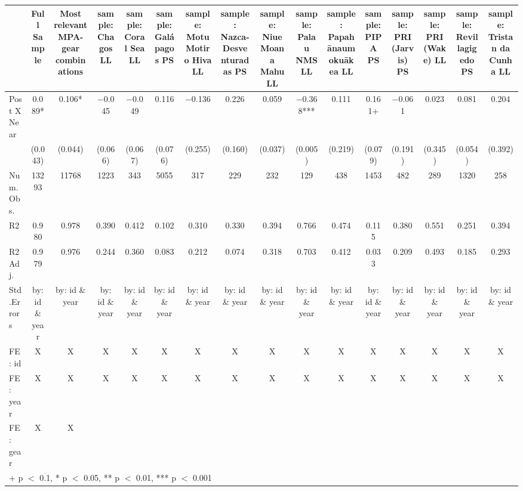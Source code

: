 \begin{table}
\centering
\begin{tabular}[t]{lccccccccccccccc}
\toprule
  & Full Sample & Most relevant MPA-gear combinations & sample: Chagos LL & sample: Coral Sea LL & sample: Galápagos PS & sample: Motu Motiro Hiva LL & sample: Nazca-Desventuradas PS & sample: Niue Moana Mahu LL & sample: Palau NMS LL & sample: Papahānaumokuākea LL & sample: PIPA PS & sample: PRI (Jarvis) PS & sample: PRI (Wake) LL & sample: Revillagigedo PS & sample: Tristan da Cunha LL\\
\midrule
Post X Near & \num{0.089}* & \num{0.106}* & \num{-0.045} & \num{-0.049} & \num{0.116} & \num{-0.136} & \num{0.226} & \num{0.059} & \num{-0.368}*** & \num{0.111} & \num{0.161}+ & \num{-0.061} & \num{0.023} & \num{0.081} & \num{0.204}\\
 & (\num{0.043}) & (\num{0.044}) & (\num{0.066}) & (\num{0.067}) & (\num{0.076}) & (\num{0.255}) & (\num{0.160}) & (\num{0.037}) & (\num{0.005}) & (\num{0.219}) & (\num{0.079}) & (\num{0.191}) & (\num{0.345}) & (\num{0.054}) & (\num{0.392})\\
\midrule
Num.Obs. & \num{13293} & \num{11768} & \num{1223} & \num{343} & \num{5055} & \num{317} & \num{229} & \num{232} & \num{129} & \num{438} & \num{1453} & \num{482} & \num{289} & \num{1320} & \num{258}\\
R2 & \num{0.980} & \num{0.978} & \num{0.390} & \num{0.412} & \num{0.102} & \num{0.310} & \num{0.330} & \num{0.394} & \num{0.766} & \num{0.474} & \num{0.115} & \num{0.380} & \num{0.551} & \num{0.251} & \num{0.394}\\
R2 Adj. & \num{0.979} & \num{0.976} & \num{0.244} & \num{0.360} & \num{0.083} & \num{0.212} & \num{0.074} & \num{0.318} & \num{0.703} & \num{0.412} & \num{0.033} & \num{0.209} & \num{0.493} & \num{0.185} & \num{0.293}\\
Std.Errors & by: id \& year & by: id \& year & by: id \& year & by: id \& year & by: id \& year & by: id \& year & by: id \& year & by: id \& year & by: id \& year & by: id \& year & by: id \& year & by: id \& year & by: id \& year & by: id \& year & by: id \& year\\
FE: id & X & X & X & X & X & X & X & X & X & X & X & X & X & X & X\\
FE: year & X & X & X & X & X & X & X & X & X & X & X & X & X & X & X\\
FE: gear & X & X &  &  &  &  &  &  &  &  &  &  &  &  & \\
\bottomrule
\multicolumn{16}{l}{\rule{0pt}{1em}+ p $<$ 0.1, * p $<$ 0.05, ** p $<$ 0.01, *** p $<$ 0.001}\\
\end{tabular}
\end{table}
